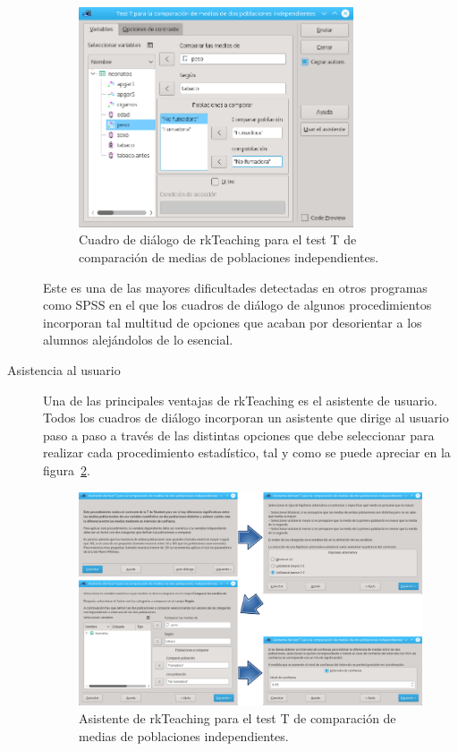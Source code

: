 \documentclass[a4paper,10pt,twoside]{article}
\newcommand{\rkteaching}{\textsf{rkTeaching}}
\newcommand{\spss}{\textsf{SPSS}}
\begin{document}
\begin{description}
\begin{figure}[htbp!]
\centering
\includegraphics[width=0.8\textwidth]{img/dialogo_test_t.png}
\caption{Cuadro de diálogo de \rkteaching{} para el test T de comparación de medias de poblaciones independientes.}
\label{f:dialogo-test-t}
\end{figure}

Este es una de las mayores dificultades detectadas en otros programas como \spss{} en el que los
cuadros de diálogo de algunos procedimientos incorporan tal multitud de opciones que acaban por desorientar a los
alumnos alejándolos de lo esencial.


\item[Asistencia al usuario] Una de las principales ventajas de \rkteaching{} es el asistente de usuario. 
Todos los cuadros de diálogo incorporan un asistente que dirige al usuario paso a paso a través de las
distintas opciones que debe seleccionar para realizar cada procedimiento estadístico, tal y como se puede apreciar en la
figura~\ref{f:asistente-test-t}.

\begin{figure}[htbp!]
\centering
\includegraphics[width=\textwidth]{img/asistente_test_t.png}
\caption{Asistente de \rkteaching{} para el test T de comparación de medias de poblaciones independientes.}
\label{f:asistente-test-t}
\end{figure}


\end{description}
\end{document}
